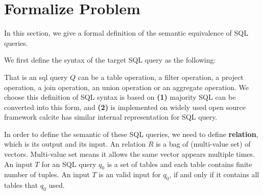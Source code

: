 \section{Formalize Problem}\label{sec:formalize}
%
In this section, we give a formal definition of the semantic equivalence of SQL queries.

%
We first define the syntax of the target SQL query as the following:
%

%
That is an sql query $Q$ can be a table operation, a filter operation, a project operation, a join operation, an union operation or an 
aggregate operation.
%
We choose this definition of SQL syntax is based on
\textbf{(1)} majority SQL can be converted into this form, and
\textbf{(2)} \sys is implemented on widely used open source framework calcite has similar internal representation for SQL query.
%

%
In order to define the semantic of these SQL queries, we need to define \textbf{relation}, which is its output and its input.
%
An relation $R$ is a bag of (multi-value set) of vectors.
%
Multi-value set means it allows the same vector appears multiple times.
%
An input $T$ for an SQL query $q_0$ is a set of tables and each table contains finite number of tuples.
%
An input $T$ is an valid input for $q_0$, if and only if it contains all tables that $q_0$ used.

